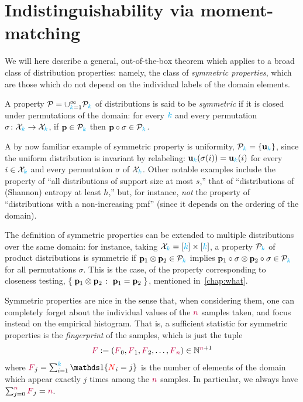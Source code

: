 \section{Indistinguishability via moment-matching}
\label{ssec:momentmatching}
We will here describe a general, out-of-the-box theorem which applies to a broad class of distribution properties: namely, the class of \emph{symmetric properties}, which are those which do not depend on the individual labels of the domain elements.
\begin{definition}
	A property $\mathcal{P}=\cup_{{\textcolor{cyan}{k}}=1}^\infty \mathcal{P}_{\textcolor{cyan}{k}}$ of distributions is said to be \emph{symmetric} if it is closed under permutations of the domain: for every ${\textcolor{cyan}{k}}$ and every permutation $\sigma\colon\mathcal{X}_{\textcolor{cyan}{k}}\to \mathcal{X}_{\textcolor{cyan}{k}}$, if $\mathbf{p}\in\mathcal{P}_{\textcolor{cyan}{k}}$ then $\mathbf{p}\circ\sigma\in\mathcal{P}_{\textcolor{cyan}{k}}$.
\end{definition}
A by now familiar example of symmetric property is uniformity, $\mathcal{P}_{\textcolor{cyan}{k}} =\{\mathbf{u}_{ {\textcolor{cyan}{k}} } \}$, since the uniform distribution is invariant by relabeling: $\mathbf{u}_{ {\textcolor{cyan}{k}} } (\sigma(i))=\mathbf{u}_{ {\textcolor{cyan}{k}} } (i)$ for every $i\in\mathcal{X}_{\textcolor{cyan}{k}}$ and every permutation $\sigma$ of $\mathcal{X}_{\textcolor{cyan}{k}}$. Other notable examples include the property of ``all distributions of support size at most $s$,'' that of ``distributions of (Shannon) entropy at least $h$,'' but, for instance, \emph{not} the property of ``distributions with a non-increasing pmf'' (since it depends on the ordering of the domain).

The definition of symmetric properties can be extended to multiple distributions over the same domain: for instance, taking $\mathcal{X}_{\textcolor{cyan}{k}}=[{\textcolor{cyan}{k}}]\times[{\textcolor{cyan}{k}}]$, a property $\mathcal{P}_{\textcolor{cyan}{k}}$ of product distributions is symmetric if $\mathbf{p}_1\otimes \mathbf{p}_2\in \mathcal{P}_{\textcolor{cyan}{k}}$ implies $\mathbf{p}_1\circ\sigma\otimes \mathbf{p}_2\circ\sigma\in \mathcal{P}_{\textcolor{cyan}{k}}$ for all permutations $\sigma$. This is the case, \eg of the property corresponding to {closeness testing}, $\setOfSuchThat{\p_1\otimes\p_2}{\p_1=\p_2}$, mentioned in~\cref{chap:what}.

Symmetric properties are nice in the sense that, when considering them, one can completely forget about the individual values of the ${\textcolor{purple}{n}}$ samples taken, and focus instead on the empirical histogram. That is, a sufficient statistic for symmetric properties is the \emph{fingerprint} of the samples, which is just the tuple
\[
	\textcolor{purple}{F}:= (\textcolor{purple}{F}_{0},\textcolor{purple}{F}_{1},\textcolor{purple}{F}_{2},\dots,\textcolor{purple}{F}_{{\textcolor{purple}{n}}}) \in \mathbb{N}^{{\textcolor{purple}{n}}+1}
\]
where $\freq_{j} = \sum_{i=1}^\ab \indic{\occur_{i}=j}$ is the number of elements of the domain which appear exactly $j$ times among the ${\textcolor{purple}{n}}$ samples. In particular, we always have $\sum_{j=0}^{\textcolor{purple}{n}} \textcolor{purple}{F}_j = {\textcolor{purple}{n}}$.\medskip

